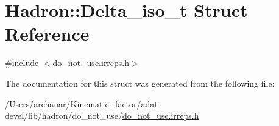 \hypertarget{structHadron_1_1Delta__iso__t}{}\section{Hadron\+:\+:Delta\+\_\+iso\+\_\+t Struct Reference}
\label{structHadron_1_1Delta__iso__t}


{\ttfamily \#include $<$do\+\_\+not\+\_\+use.\+irreps.\+h$>$}



The documentation for this struct was generated from the following file\+:\begin{DoxyCompactItemize}
\item 
/\+Users/archanar/\+Kinematic\+\_\+factor/adat-\/devel/lib/hadron/do\+\_\+not\+\_\+use/\mbox{\hyperlink{adat-devel_2lib_2hadron_2do__not__use_2do__not__use_8irreps_8h}{do\+\_\+not\+\_\+use.\+irreps.\+h}}\end{DoxyCompactItemize}

